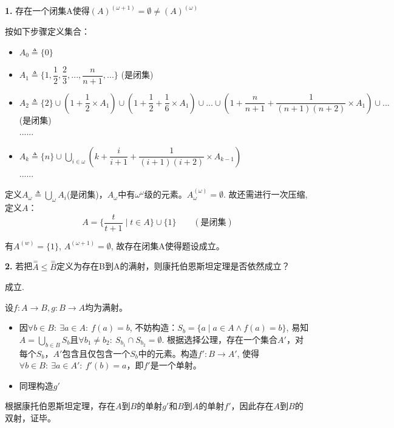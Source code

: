 \documentclass[UTF8, 9pt, a4paper]{ctexart}
\newcommand{\ksec}[2]{\noindent \textbf{\large #1} #2\par}
\begin{document}
	
	\ksec{1. }{存在一个闭集A使得$ (A)^{(\omega + 1)} = \emptyset \neq (A)^{(\omega)} $ }
	按如下步骤定义集合：
	\begin{itemize}
		\item $ A_0 \triangleq \{0\} $
		\item $ A_1 \triangleq \{1,\dfrac{1}{2}, \dfrac{2}{3}, ..., \dfrac{n}{n+1}, ... \} $ (是闭集)
		\item $ A_2 \triangleq \{2\} \cup (1 + \dfrac{1}{2} \times A_1) \cup (1+\dfrac{1}{2}+ \dfrac{1}{6} \times A_1 )\cup... \cup (1 + \dfrac{n}{n+1} + \dfrac{1}{(n+1)(n+2)} \times A_1) \cup... $ (是闭集)\\
		......
		\item $ A_k \triangleq \{n\} \cup \bigcup\limits_{i \in \omega} (k + \dfrac{i}{i+1} + \dfrac{1}{(i+1)(i+2)} \times A_{k-1}) $\\
		......
	\end{itemize}
	定义$ A_\omega \triangleq \bigcup\limits_{\omega}^{} A_i $(是闭集)，$ A_\omega $中有$ \omega^\omega $级的元素。$ A_\omega^{(\omega)} = \emptyset $. 故还需进行一次压缩, 定义$ A $：
		$$ A = \{ \dfrac{t}{t+1} \mid t \in A \} \cup \{1\} \qquad (\texttt{是闭集})$$  
		
	有$ A^{(w)} = \{1\} $, $ A^{(\omega + 1)} = \emptyset $, 故存在闭集A使得题设成立。
	
	
	
	\vspace{0.5cm}
	
	\ksec{2. }{若把$ \overset{=}{A} \leq \overset{=}{B} $定义为存在B到A的满射，则康托伯恩斯坦定理是否依然成立？}
	
	成立.\par
	设$ f: A \rightarrow B, g: B \rightarrow A $均为满射。
	\begin{itemize}
		\item 因$ \forall b \in B:\ \exists a\in A:\ f(a) = b $, 不妨构造：$ S_b = \{ a \mid a\in A \land f(a) = b\} $, 易知$ A = \bigcup\limits_{b \in B} S_b  $且$ \forall b_1 \neq b_2:\ S_{b_1} \cap S_{b_2} = \emptyset $. 根据选择公理，存在一个集合$ A' $，对每个$ S_b $，$ A' $包含且仅包含一个$ S_b $中的元素。构造$ f': B \rightarrow A' $, 使得$ \forall b \in B:\ \exists a \in A':\ f'(b) = a$，即$ f' $是一个单射。
		
		\item 同理构造$ g' $
	\end{itemize}

	根据康托伯恩斯坦定理，存在$ A $到$ B $的单射$ g' $和$ B $到$ A $的单射$ f' $，因此存在$ A $到$ B $的双射，证毕。
	
\end{document}
